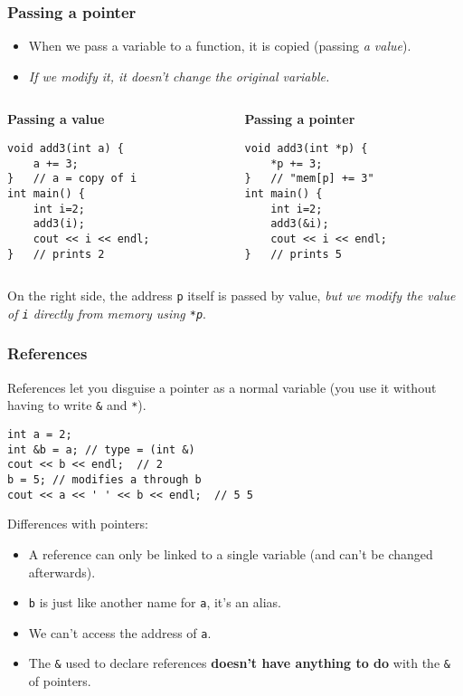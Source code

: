 \documentclass[12pt]{beamer}
\begin{document}
\begin{frame}[fragile]
\frametitle{Passing a pointer}
\begin{itemize}
\item When we pass a variable to a function, it is copied (passing \emph{a value}).
\item \emph{If we modify it, it doesn't change the original variable.}
\end{itemize}
\vspace{3pt}
\begin{columns}[T]
\begin{column}{.45\textwidth}
\textbf{Passing a value}
\begin{lstlisting}
void add3(int a) {
    a += 3;
}   // a = copy of i
int main() {
    int i=2;
    add3(i);
    cout << i << endl;
}   // prints 2
\end{lstlisting}
\end{column}
\begin{column}{.45\textwidth}
\textbf{Passing a pointer}
\begin{lstlisting}
void add3(int *p) {
    *p += 3;
}   // "mem[p] += 3"
int main() {
    int i=2;
    add3(&i);
    cout << i << endl;
}   // prints 5
\end{lstlisting}
\end{column}
\end{columns}
\vspace{3pt}
On the right side, the address \lstinline|p| itself is passed by value, \emph{but we modify the value of \lstinline|i| directly from memory using \lstinline|*p|}.
\end{frame}

\begin{frame}[fragile]
\frametitle{References}
References let you disguise a pointer as a normal variable (you use it without having to write \lstinline|&| and \lstinline|*|).
\begin{lstlisting}
int a = 2;
int &b = a; // type = (int &)
cout << b << endl;  // 2
b = 5; // modifies a through b
cout << a << ' ' << b << endl;  // 5 5
\end{lstlisting}
Differences with pointers:
\begin{itemize}
\item A reference can only be linked to a single variable (and can't be changed afterwards).
\item \lstinline|b| is just like another name for \lstinline|a|, it's an alias.
\item We can't access the address of \lstinline|a|.
\item The \lstinline|&| used to declare references \textbf{doesn't have anything to do} with the \lstinline|&| of pointers.
\end{itemize}
\end{frame}
\end{document}
